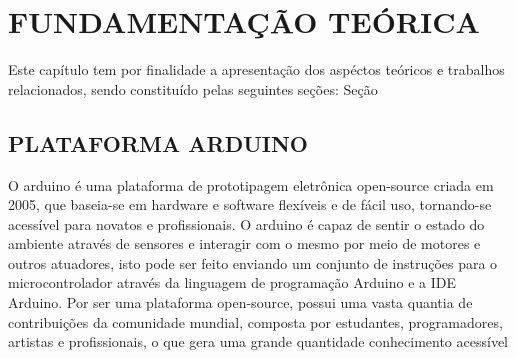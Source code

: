 
\chapter{FUNDAMENTAÇÃO TEÓRICA}
\label{chap:fundamentacao-teorica}Este capítulo tem por finalidade a apresentação dos aspéctos teóricos e trabalhos relacionados, sendo constituído pelas seguintes seções: Seção 

\section{PLATAFORMA ARDUINO}
\label{sec:arduino} O arduino é uma plataforma de prototipagem eletrônica open-source criada em 2005, que baseia-se em hardware e software flexíveis e de fácil uso, tornando-se acessível para novatos e profissionais. O arduino é capaz de sentir o estado do ambiente através de sensores e interagir com o mesmo por meio de motores e outros atuadores, isto pode ser feito enviando um conjunto de instruções para o microcontrolador através da linguagem de programação Arduino e a IDE Arduino. Por ser uma plataforma open-source, possui uma vasta quantia de contribuições da comunidade mundial, composta por estudantes, programadores, artistas e profissionais, o que gera uma grande quantidade conhecimento acessível

